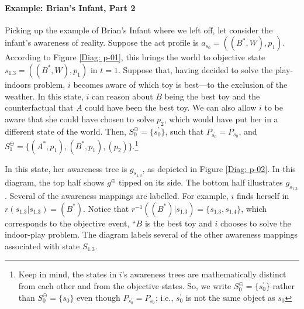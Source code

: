 \documentclass[
11pt,
titlepage,
reqno,
]{article}%
\theoremstyle{definition}
\begin{document}
%	
	
\paragraph{Example: Brian's Infant, Part 2}	
Picking up the example of Brian's Infant where we left off, let consider the infant's awareness of reality.
Suppose the act profile is $a_{s_0}=((B^\ast,W),p_1)$.
According to Figure \ref{Diag: p-01}, this brings the world to objective state $s_{1.3}=((B^\ast,W),p_1)$ in  $t=1$.
Suppose that, having decided to solve the play-indoors problem, $i$ becomes aware of which toy is best---to the exclusion of the weather.
In this state, $i$ can reason about $B$ being the best toy and the counterfactual that $A$ could have been the best toy.
We can also allow $i$ to be aware that she could have chosen to solve $p_2$, which would have put her in a different state of the world. 
Then, $S^\ominus_0=\{s^\prime_0\}$, such that $P_{s^\prime_0}=P_{s_0}$, and  $S^\ominus_1=\{(A^\ast,p_1),(B^\ast,p_1),(p_2)\}$.\footnote
{
	Keep in mind, the states in $i$'s awareness trees are mathematically distinct from each other and from the objective states. So, we write  $S^\ominus_0=\{s^\prime_0\}$ rather than $S^\ominus_0=\{s_0\}$ even though $P_{s^\prime_0}=P_{s_0}$; i.e., $s^\prime_0$ is not the same object as $s_0$
}

In this state, her awareness tree is $g_{s_{1.3}}$, as depicted in Figure \ref{Diag: p-02}.
In this diagram, the top half shows $g^\oplus$ tipped on its side. 
The bottom half illustrates $g_{s_{1.3}}$.
Several of the awareness mappings are labelled.
For example, $i$ finds herself in $r(s_{1.3}|s_{1.3})=(B^\ast)$.
Notice that $r^{-1}((B^\ast)|s_{1.3})=\{s_{1.3},s_{1.4}\}$, which corresponds to the objective event, ``$B$ is the best toy and $i$ chooses to solve the indoor-play problem.
The diagram labels several of the other awareness mappings associated with state $S_{1.3}$.
\end{document}
